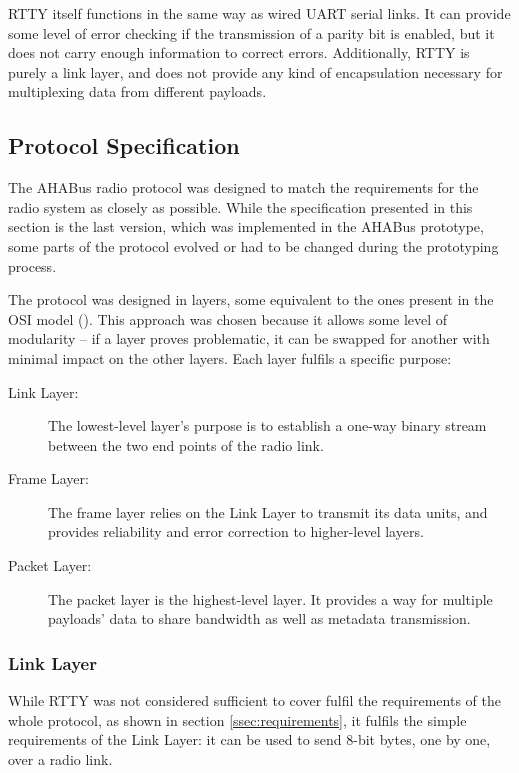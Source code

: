 RTTY itself functions in the same way as wired UART serial links. It can provide
some level of error checking if the transmission of a parity bit is enabled, but
it does not carry enough information to correct errors. Additionally, RTTY is
purely a link layer, and does not provide any kind of encapsulation necessary
for multiplexing data from different payloads.

\subsection{Protocol Specification}

The AHABus radio protocol was designed to match the requirements for the radio
system as closely as possible. While the specification presented in this section
is the last version, which was implemented in the AHABus prototype, some parts
of the protocol evolved or had to be changed during the prototyping process.

The protocol was designed in layers, some equivalent to the ones present in the
OSI model (\cite{Stallings1987}). This approach was chosen because it allows
some level of modularity – if a layer proves problematic, it can be swapped
for another with minimal impact on the other layers. Each layer fulfils a
specific purpose:

\begin{description}
\item[Link Layer:] The lowest-level layer's purpose is to establish a one-way
binary stream between the two end points of the radio link.

\item[Frame Layer:] The frame layer relies on the Link Layer to transmit its
data units, and provides reliability and error correction to higher-level 
layers.

\item[Packet Layer:] The packet layer is the highest-level layer. It provides
a way for multiple payloads' data to share bandwidth as well as metadata
transmission.
\end{description}

\subsubsection{Link Layer}

While RTTY was not considered sufficient to cover fulfil the requirements of
the whole protocol, as shown in section \ref{ssec:requirements}, it fulfils the
simple requirements of the Link Layer: it can be used to send 8-bit bytes, one
by one, over a radio link.


